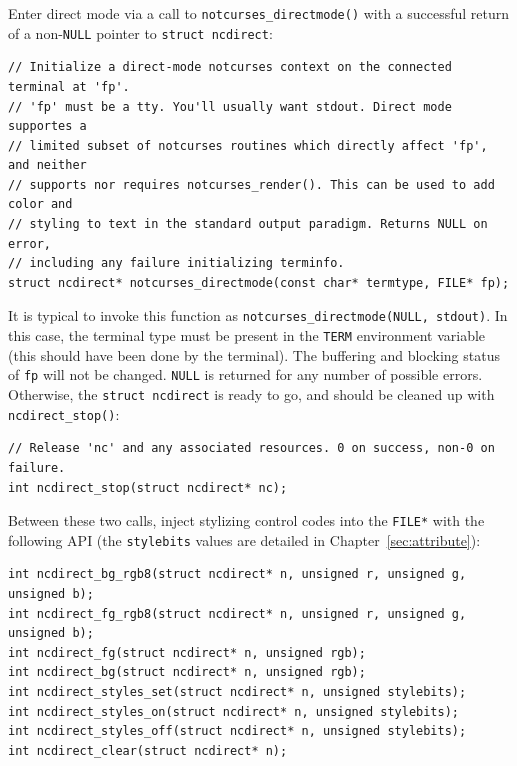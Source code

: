 \documentclass[letterpaper,10pt]{article}
\begin{document}
Enter direct mode via a call to \texttt{notcurses\_directmode()} with a successful
return of a non-\texttt{NULL} pointer to \texttt{struct ncdirect}:

\begin{listing}[!htbp]
\begin{verbatim}
// Initialize a direct-mode notcurses context on the connected terminal at 'fp'.
// 'fp' must be a tty. You'll usually want stdout. Direct mode supportes a
// limited subset of notcurses routines which directly affect 'fp', and neither
// supports nor requires notcurses_render(). This can be used to add color and
// styling to text in the standard output paradigm. Returns NULL on error,
// including any failure initializing terminfo.
struct ncdirect* notcurses_directmode(const char* termtype, FILE* fp);
\end{verbatim}
\end{listing}

It is typical to invoke this function as \texttt{notcurses\_directmode(NULL, stdout)}.
In this case, the terminal type must be present in the \texttt{TERM} environment
variable (this should have been done by the terminal). The buffering and
blocking status of \texttt{fp} will not be changed. \texttt{NULL} is returned for any number
of possible errors. Otherwise, the \texttt{struct ncdirect} is ready to go, and should
be cleaned up with \texttt{ncdirect\_stop()}:

\begin{listing}[!htbp]
\begin{verbatim}
// Release 'nc' and any associated resources. 0 on success, non-0 on failure.
int ncdirect_stop(struct ncdirect* nc);
\end{verbatim}
\end{listing}

Between these two calls, inject stylizing control codes into the \texttt{FILE*} with
the following API (the \texttt{stylebits} values are detailed in Chapter~\ref{sec:attribute}):

\begin{listing}[!htbp]
\begin{verbatim}
int ncdirect_bg_rgb8(struct ncdirect* n, unsigned r, unsigned g, unsigned b);
int ncdirect_fg_rgb8(struct ncdirect* n, unsigned r, unsigned g, unsigned b);
int ncdirect_fg(struct ncdirect* n, unsigned rgb);
int ncdirect_bg(struct ncdirect* n, unsigned rgb);
int ncdirect_styles_set(struct ncdirect* n, unsigned stylebits);
int ncdirect_styles_on(struct ncdirect* n, unsigned stylebits);
int ncdirect_styles_off(struct ncdirect* n, unsigned stylebits);
int ncdirect_clear(struct ncdirect* n);
\end{verbatim}
\end{listing}
\end{document}
